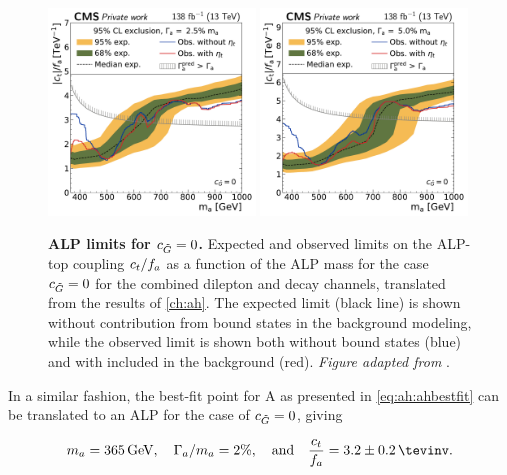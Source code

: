 \begin{figure}[t]
    \centering
    \includegraphics[width=0.49\textwidth]{figures/alps/A_limit_w2p5_g-scan_alp_lx.pdf}
    \hfill
    \includegraphics[width=0.49\textwidth]{figures/alps/A_limit_w5p0_g-scan_alp_lx.pdf}
    \caption{
        \textbf{ALP limits for $c_{\tilde{G}} = 0$.} Expected and observed limits on the ALP-top coupling $c_t / f_a$ as a function of the ALP mass for the case $c_{\tilde{G}} = 0$ for the combined dilepton and \ljets decay channels, translated from the results of \cref{ch:ah}. The expected limit (black line) is shown without contribution from \ttbar bound states in the background modeling, while the observed limit is shown both without \ttbar bound states (blue) and with \etat included in the background (red). \textit{Figure adapted from }.
    }
    \label{fig:alps:translation}
\end{figure}

In a similar fashion, the best-fit point for A as presented in \cref{eq:ah:ahbestfit} can be translated to an ALP for the case of $c_{\tilde{G}} = 0$, giving

\begin{equation*}
    m_a = \SI{365}{\GeV}, \quad \Gamma_a / m_a = 2\%, \quad \text{and} \quad \frac{\ct}{f_a} = 3.2 \pm 0.2 \, \si{\tevinv}.
\end{equation*}

